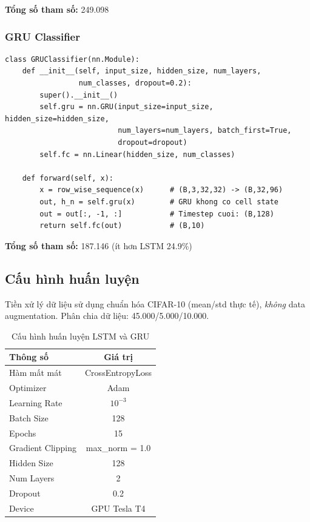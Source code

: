 \documentclass[a4paper]{article}
\theoremstyle{definition}
\begin{document}
\textbf{Tổng số tham số:} 249.098

\subsubsection{GRU Classifier}
\begin{verbatim}
class GRUClassifier(nn.Module):
    def __init__(self, input_size, hidden_size, num_layers,
                 num_classes, dropout=0.2):
        super().__init__()
        self.gru = nn.GRU(input_size=input_size, hidden_size=hidden_size,
                          num_layers=num_layers, batch_first=True,
                          dropout=dropout)
        self.fc = nn.Linear(hidden_size, num_classes)

    def forward(self, x):
        x = row_wise_sequence(x)      # (B,3,32,32) -> (B,32,96)
        out, h_n = self.gru(x)        # GRU khong co cell state
        out = out[:, -1, :]           # Timestep cuoi: (B,128)
        return self.fc(out)           # (B,10)
\end{verbatim}

\textbf{Tổng số tham số:} 187.146 (ít hơn LSTM 24.9\%)

\subsection{Cấu hình huấn luyện}

Tiền xử lý dữ liệu sử dụng chuẩn hóa CIFAR-10 (mean/std thực tế), \textit{không} data augmentation. Phân chia dữ liệu: 45.000/5.000/10.000.

\begin{table}[H]
	\centering
	\caption{Cấu hình huấn luyện LSTM và GRU}
	\begin{tabular}{|l|c|}
		\hline
		\textbf{Thông số}               & \textbf{Giá trị}       \\ \hline
		Hàm mất mát                     & CrossEntropyLoss       \\ \hline
		Optimizer                        & Adam                   \\ \hline
		Learning Rate                    & $10^{-3}$              \\ \hline
		Batch Size                       & 128                    \\ \hline
		Epochs                           & 15                     \\ \hline
		Gradient Clipping                & max\_norm = 1.0        \\ \hline
		Hidden Size                      & 128                    \\ \hline
		Num Layers                       & 2                      \\ \hline
		Dropout                          & 0.2                    \\ \hline
		Device                           & GPU Tesla T4           \\ \hline
	\end{tabular}
	\label{tab:lstm-gru-config}
\end{table}
\end{document}
